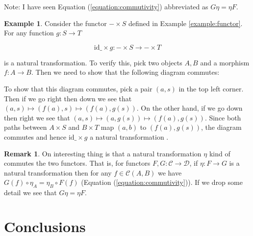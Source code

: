 \documentclass{article}
\theoremstyle{definition}
\newtheorem{example}{Example}[section]
\newtheorem{remark}{Remark}[section]
\begin{document}
\bigskip
\noindent
Note: I have seen Equation (\ref{equation:commutivity}) 
abbreviated as $G \eta = \eta F$.

\medskip
\noindent
\begin{example}
Consider the functor $- \times S$ defined in Example
\ref{example:functor}. For any function $g : S \to T$

\begin{equation*}
\text{id}\_ \times g : - \times S \to - \times T 
\end{equation*}

\smallskip
\noindent
is a natural transformation. To verify this, pick two objects 
$A,B$ and a morphism $f : A \to B$. Then we need to show 
that the following diagram commutes:

\medskip
%
%
%
\begin{center}
\end{center}

\bigskip
\noindent
To show that this diagram commutes, pick a pair $(a,s)$ in the
top left corner.  Then if we go right then down we see that
$(a,s) \mapsto (f(a),s) \mapsto (f(a),g(s))$.  On the other hand,
if we go down then right we see that $(a,s) \mapsto (a, g(s))
\mapsto (f (a), g(s))$.  Since both paths between $A \times S$
and $B \times T$ map $(a,b)$ to $(f(a),g(s))$, the diagram
commutes and hence $\text{id}\_ \times g$ a natural
transformation \cite{intro_category_theory_notes}.
\end{example}

\begin{remark}
On interesting thing is that a natural transformation $\eta$ 
kind of commutes the two functors. That is, for functors 
$F,G: \mathcal{C} \to \mathcal{D}$, if $\eta : F \to G$ is a 
natural transformation then for any $f \in \mathcal{C}(A,B)$ 
we have $G(f) \circ \eta_{A} = \eta_{B} \circ F(f)$ 
(Equation (\ref{equation:commutivity})). If we drop some detail 
we see that $G \eta = \eta F$.
\label{remark:natural_transformation_commutes}
\end{remark}
%
%
%
\section{Conclusions}
\label{section:conclusions}
%
%
%
\end{document}
